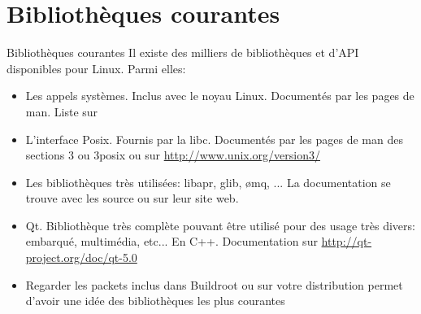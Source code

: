 \section{Bibliothèques courantes}

\begin{frame}[fragile=singleslide]{Bibliothèques courantes}
  Il existe  des milliers de  bibliothèques et d'API  disponibles pour
  Linux. Parmi elles:
  \begin{itemize} 
  \item Les  appels systèmes. Inclus  avec le noyau  Linux. Documentés
    par les pages de man. Liste sur 
  \item L'interface  Posix.  Fournis par la libc.   Documentés par les
    pages    de   man   des    sections   3    ou   3posix    ou   sur
    \url{http://www.unix.org/version3/}
  \item Les bibliothèques très  utilisées: libapr, glib, ømq, ...  La
    documentation se trouve avec les source ou sur leur site web.
  \item Qt.  Bibliothèque très complète pouvant être  utilisé pour des
    usage    très   divers:    embarqué,    multimédia,   etc...    En
    C++. Documentation sur \url{http://qt-project.org/doc/qt-5.0}
  \item  Regarder  les packets  inclus  dans  Buildroot  ou sur  votre
    distribution permet  d'avoir une  idée des bibliothèques  les plus
    courantes
  \end{itemize} 
\end{frame} 


